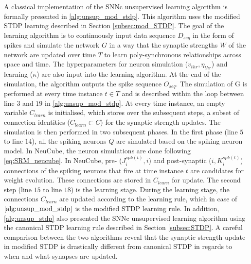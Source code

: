 A classical implementation of the SNNc unsupervised learning algorithm is formally presented in \algorithmname \ref{alg:unsup_mod_stdp}. This algorithm uses the modified STDP learning described in Section \ref{subsec:mod_STDP}. The goal of the learning algorithm is to continuously input data sequence $D_{seq}$ in the form of spikes and simulate the network $G$ in a way that the synaptic strengths $W$ of the network are updated over time $T$ to learn poly-synchronous relationships across space and time. The hyperparameters for neuron simulation ($v_{thr}, \eta_{thr}$) and learning ($\kappa$) are also input into the learning algorithm. At the end of the simulation, the algorithm outputs the  spike sequence $O_{seq}$. The simulation of G is performed at every time instance $t \in T$ and is described within the loop between line $3$ and $19$ in \algorithmname \ref{alg:unsup_mod_stdp}. At every time instance, an empty variable $C_{learn}$ is initialised, which stores over the subsequent steps, a subset of connection identities ($C_{learn}\subset C$) for the synaptic strength updates. The simulation is then performed in two subsequent phases. In the first phase (line $5$ to line $14$), all the spiking neurons $Q$ are simulated based on the spiking neuron model. In NeuCube, the neuron simulations are done following \equationname \ref{eq:SRM_neucube}. In NeuCube, pre- ($J_i^{spk(t)}, i$) and post-synaptic ($i, K_i^{spk(t)}$) connections of the spiking neurons that fire at time instance $t$ are candidates for weight evolution. These connections are stored in $C_{learn}$ for update. The second step (line $15$ to line $18$) is the learning stage. During the learning stage, the connections $C_{learn}$ are updated according to the learning rule, which in case of \algorithmname $\ref{alg:unsup_mod_stdp}$ is the modified STDP learning rule. In addition, \algorithmname \ref{alg:unsup_stdp} also presented the SNNc unsupervised learning algorithm using the canonical STDP learning rule described in Section \ref{subsec:STDP}. A careful comparison between the two algorithms reveal that the synaptic strength update in modified STDP is drastically different from canonical STDP in regards to when and what synapses are updated.    

